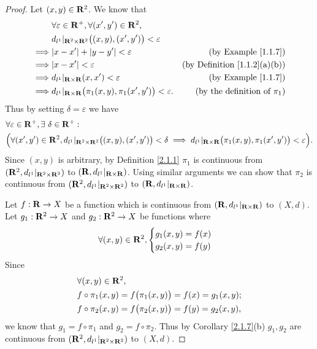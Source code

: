 \begin{proof}
    Let \((x, y) \in \mathbf{R}^2\).
    We know that
    \begin{align*}
                 & \forall \varepsilon \in \R^+, \forall (x', y') \in \R^2,                                                              \\
                 & d_{l^1}|_{\R^2 \times \R^2}\big((x, y), (x', y')\big) < \varepsilon                                                   \\
        \implies & \abs{x - x'} + \abs{y - y'} < \varepsilon                                  & \text{(by Example \ref{1.1.7})}          \\
        \implies & \abs{x - x'} < \varepsilon                                                 & \text{(by Definition \ref{1.1.2}(a)(b))} \\
        \implies & d_{l^1}|_{\R \times \R}(x, x') < \varepsilon                               & \text{(by Example \ref{1.1.7})}          \\
        \implies & d_{l^1}|_{\R \times \R}\big(\pi_1(x, y), \pi_1(x', y')\big) < \varepsilon. & \text{(by the definition of \(\pi_1\))}
    \end{align*}
    Thus by setting \(\delta = \varepsilon\) we have
    \begin{align*}
         & \forall \varepsilon \in \mathbf{R}^+, \exists\ \delta \in \mathbf{R}^+ :                                                                                                                                \\
         & \Big(\forall (x', y') \in \mathbf{R}^2, d_{l^1}|_{\mathbf{R}^2 \times \mathbf{R}^2}\big((x, y), (x', y')\big) < \delta \implies d_{l^1}|_{\mathbf{R} \times \mathbf{R}}\big(\pi_1(x, y), \pi_1(x', y')\big) < \varepsilon\Big).
    \end{align*}
    Since \((x, y)\) is arbitrary, by Definition \ref{2.1.1} \(\pi_1\) is continuous from \((\mathbf{R}^2, d_{l^1}|_{\mathbf{R}^2 \times \mathbf{R}^2})\) to \((\mathbf{R}, d_{l^1}|_{\mathbf{R} \times \mathbf{R}})\).
    Using similar arguments we can show that \(\pi_2\) is continuous from \((\mathbf{R}^2, d_{l^1}|_{\mathbf{R}^2 \times \mathbf{R}^2})\) to \((\mathbf{R}, d_{l^1}|_{\mathbf{R} \times \mathbf{R}})\).

    Let \(f : \mathbf{R} \to X\) be a function which is continuous from \((\mathbf{R}, d_{l^1}|_{\mathbf{R} \times \mathbf{R}})\) to \((X, d)\).
    Let \(g_1 : \mathbf{R}^2 \to X\) and \(g_2 : \mathbf{R}^2 \to X\) be functions where
    \[
        \forall (x, y) \in \mathbf{R}^2, \begin{cases}
            g_1(x, y) = f(x) \\
            g_2(x, y) = f(y)
        \end{cases}
    \]
    Since
    \begin{align*}
         & \forall (x, y) \in \mathbf{R}^2,                                         \\
         & f \circ \pi_1(x, y) = f\big(\pi_1(x, y)\big) = f(x) = g_1(x, y); \\
         & f \circ \pi_2(x, y) = f\big(\pi_2(x, y)\big) = f(y) = g_2(x, y),
    \end{align*}
    we know that \(g_1 = f \circ \pi_1\) and \(g_2 = f \circ \pi_2\).
    Thus by Corollary \ref{2.1.7}(b) \(g_1, g_2\) are continuous from \((\mathbf{R}^2, d_{l^1}|_{\mathbf{R}^2 \times \mathbf{R}^2})\) to \((X, d)\).
\end{proof}

